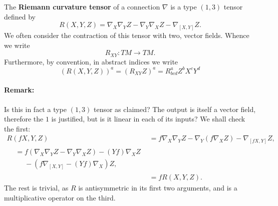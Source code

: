 \documentclass[11pt,fleqn]{report}
\begin{document}
\begin{definition}
	The \textbf{Riemann curvature tensor} of a connection $\nabla$ is a type $(1,3)$ tensor defined by
		\begin{equation}
			R(X,Y,Z) = \nabla_X \nabla_Y Z - \nabla_Y \nabla_X Z - \nabla_{[X,Y]} Z.
		\end{equation}
	We often consider the contraction of this tensor with two, vector fields. Whence we write
		\begin{equation}
			R_{XY} : TM \to TM.
		\end{equation}
	Furthermore, by convention, in abstract indices we write
		\begin{equation}
			(R(X,Y,Z))^a = (R_{XY}Z)^a = R^a_{bcd}Z^bX^cY^d
		\end{equation}
\end{definition}

\paragraph{Remark:} Is this in fact a type $(1,3)$ tensor as claimed? The output is itself a vector field, therefore the $1$ is justified, but is it linear in each of its inputs? We shall check the first:
	\begin{align}
		R(fX,Y,Z)
		&= f \nabla_X \nabla_Y Z - \nabla_Y (f \nabla_X Z) - \nabla_{[fX,Y]} Z,\\
		\begin{split}
			&=f \left( \nabla_X \nabla_Y Z - \nabla_Y \nabla_X Z \right)  - (Yf) \nabla_X Z \\
			&\phantom{=} - (f\nabla_{[X,Y]} - (Yf) \nabla_X)Z, 
		\end{split}\\
		&= f R(X,Y,Z).
	\end{align}
The rest is trivial, as $R$ is antisymmetric in its first two arguments, and is a multiplicative operator on the third.
\end{document}
